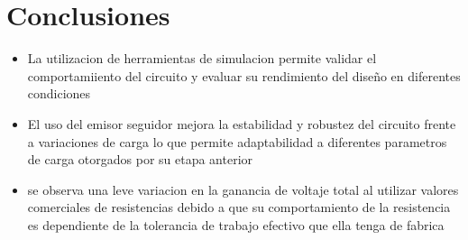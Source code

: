 \documentclass[conference]{IEEEtran}
\begin{document}
\section{Conclusiones}

\begin{itemize}
    \item La utilizacion de herramientas de simulacion permite validar el comportamiiento del circuito y evaluar su rendimiento del diseño en diferentes condiciones 

    \item El uso del emisor seguidor mejora la estabilidad y robustez del circuito frente a variaciones de carga lo que permite adaptabilidad a diferentes parametros de carga otorgados por su etapa anterior 

    \item se observa una leve variacion en la ganancia de voltaje total al utilizar valores comerciales de resistencias debido a que su comportamiento de la resistencia es dependiente de la tolerancia de trabajo efectivo que ella tenga de fabrica 
\end{itemize}

 


\end{document}

